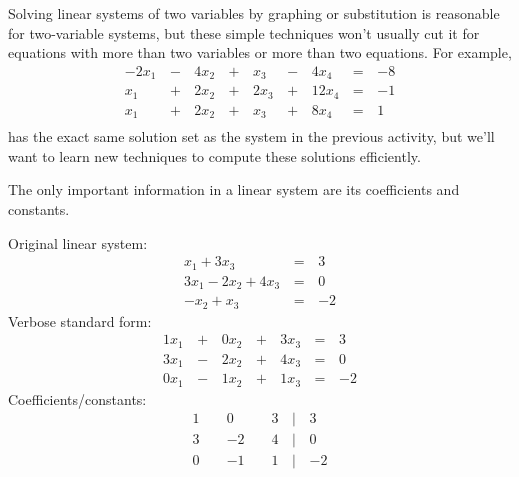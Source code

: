 \begin{observation}
  Solving linear systems of two variables by graphing or substitution is
  reasonable for two-variable systems, but these simple techniques
  won't usually cut it for equations with
  more than two variables or more than two equations. For example,
  \begin{alignat*}{5}
    -2x_1 &\,-\,& 4x_2 &\,+\,&  x_3 &\,-\,&  4x_4 &\,=\,& -8 \\
      x_1 &\,+\,& 2x_2 &\,+\,& 2x_3 &\,+\,& 12x_4 &\,=\,& -1 \\
      x_1 &\,+\,& 2x_2 &\,+\,&  x_3 &\,+\,&  8x_4 &\,=\,&  1 \\
  \end{alignat*}
  has the exact same solution set as the system in the previous
  activity, but we'll want to learn new techniques
  to compute these solutions efficiently.
\end{observation}





\begin{remark}
  The only important information in a linear system are its coefficients and
  constants.

  \begin{multicols}{3}\noindent
    Original linear system:
    \begin{alignat*}{2}
       x_1 + 3x_3 &\,=\,& 3 \\
      3x_1 - 2x_2 + 4x_3 &\,=\,& 0 \\
      -x_2 +  x_3 &\,=\,& -2
    \end{alignat*}
    Verbose standard form:
    \begin{alignat*}{4}
      1x_1 &\,+\,& 0x_2 &\,+\,& 3x_3 &\,=\,& 3 \\
      3x_1 &\,-\,& 2x_2 &\,+\,& 4x_3 &\,=\,& 0 \\
      0x_1 &\,-\,& 1x_2 &\,+\,& 1x_3 &\,=\,& -2
    \end{alignat*}
    Coefficients/constants:
    \begin{alignat*}{4}
       1 &     &  0 &\,\,& 3 &\,|\,& 3 \\
       3 &\, \,& -2 &\,\,& 4 &\,|\,& 0 \\
       0 &\, \,& -1 &\,\,& 1 &\,|\,& -2
    \end{alignat*}
  \end{multicols}
\end{remark}

